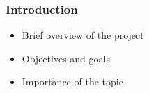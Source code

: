 \begin{frame}
    \frametitle{Introduction}
    \begin{itemize}
        \item Brief overview of the project
        \item Objectives and goals
        \item Importance of the topic
    \end{itemize}
\end{frame}